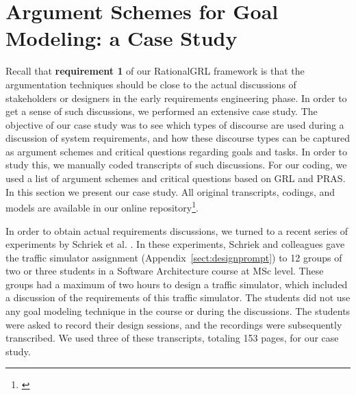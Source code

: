 \section{Argument Schemes for Goal Modeling: a Case Study}
\label{sect:gmas}

Recall that \textbf{requirement 1} of our RationalGRL framework is that the argumentation techniques should be close to the actual discussions of stakeholders or designers in the early requirements engineering phase. In order to get a sense of such discussions, we performed an extensive case study. The objective of our case study was to see which types of discourse are used during a discussion of system requirements, and how these discourse types can be captured as argument schemes and critical questions regarding goals and tasks. In order to study this, we manually coded transcripts of such discussions. For our coding, we used a list of argument schemes and critical questions based on GRL and PRAS. In this section we present our case study. All original transcripts, codings, and models are available in our online repository\footnote{\label{foot:url}}.   

In order to obtain actual requirements discussions, we turned to a recent series of experiments by Schriek et al. \cite{SchriekEtal2016}. In these experiments, Schriek and colleagues gave the traffic simulator assignment (Appendix~\ref{sect:designprompt}) to 12 groups of two or three students in a Software Architecture course at MSc level. These groups had a maximum of two hours to design a traffic simulator, which included a discussion of the requirements of this traffic simulator. The students did not use any goal modeling technique in the course or during the discussions. The students were asked to record their design sessions, and the recordings were subsequently transcribed. We used three of these transcripts, totaling 153 pages, for our case study. 


